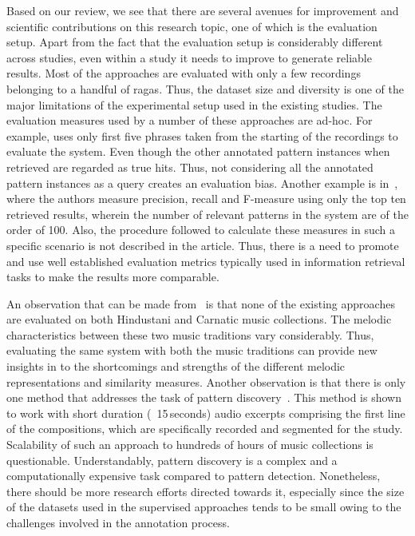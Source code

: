Based on our review, we see that there are several avenues for improvement and scientific contributions on this research topic, one of which is the evaluation setup. Apart from the fact that the evaluation setup is considerably different across studies, even within a study it needs to improve to generate reliable results. Most of the approaches are evaluated with only a few recordings belonging to a handful of \glspl{raga}. Thus, the dataset size and diversity is one of the major limitations of the experimental setup used in the existing studies. The evaluation measures used by a number of these approaches are ad-hoc. For example, \cite{ganguli2015efficient} uses only first five phrases taken from the starting of the recordings to evaluate the system. Even though the other annotated pattern instances when retrieved are regarded as true hits. Thus, not considering all the annotated pattern instances as a query creates an evaluation bias. Another example is in~\cite{Ishwar2013}, where the authors measure precision, recall and F-measure using only the top ten retrieved results, wherein the number of relevant patterns in the system are of the order of 100. Also, the procedure followed to calculate these measures in such a specific scenario is not described in the article. Thus, there is a need to promote and use well established evaluation metrics typically used in information retrieval tasks to make the results more comparable. 

An observation that can be made from~ is that none of the existing approaches are evaluated on both Hindustani and Carnatic music collections. The melodic characteristics between these two music traditions vary considerably. Thus, evaluating the same system with both the music traditions can provide new insights in to the shortcomings and strengths of the different melodic representations and similarity measures. Another observation is that there is only one method that addresses the task of pattern discovery~\citep{Dutta2014}. This method is shown to work with short duration (~15\,seconds) audio excerpts comprising the first line of the compositions, which are specifically recorded and segmented for the study. Scalability of such an approach to hundreds of hours of music collections is questionable. Understandably, pattern discovery is a complex and a computationally expensive task compared to pattern detection. Nonetheless, there should be more research efforts directed towards it, especially since the size of the datasets used in the supervised approaches tends to be small owing to the challenges involved in the annotation process.

